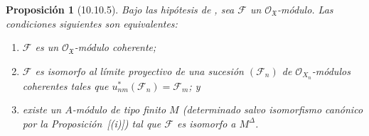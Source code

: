 \documentclass[oneside]{amsart}
\theoremstyle{ega-env-style}
\theoremstyle{ega-thm-env-style}
\newtheorem*{proposition}{Proposición}
\theoremstyle{ega-defn-env-style}
\let\EGAOriginalLabel\label
\renewcommand{\label}[1]{\phantomsection\EGAOriginalLabel{#1}}
\begin{document}
\begin{proposition}[10.10.5]
\label{I.10.10.5}
Bajo las hipótesis de , sea $\mathscr{F}$ un $\mathscr{O}_{\mathfrak{X}}$-módulo.
Las condiciones siguientes son equivalentes:
\begin{enumerate}
  \item[\textup{a)}] $\mathscr{F}$ es un $\mathscr{O}_{\mathfrak{X}}$-módulo coherente;
  \item[\textup{b)}] $\mathscr{F}$ es isomorfo al límite proyectivo  de una sucesión $(\mathscr{F}_n)$ de $\mathscr{O}_{X_n}$-módulos coherentes tales que $u_{nm}^*(\mathscr{F}_n)=\mathscr{F}_m$; y
  \item[\textup{c)}] existe un $A$-módulo de tipo finito $M$ (determinado salvo isomorfismo canónico por la Proposición~[(i)]) tal que $\mathscr{F}$ es isomorfo a $M^\Delta$.
\end{enumerate}
\end{proposition}
\end{document}
